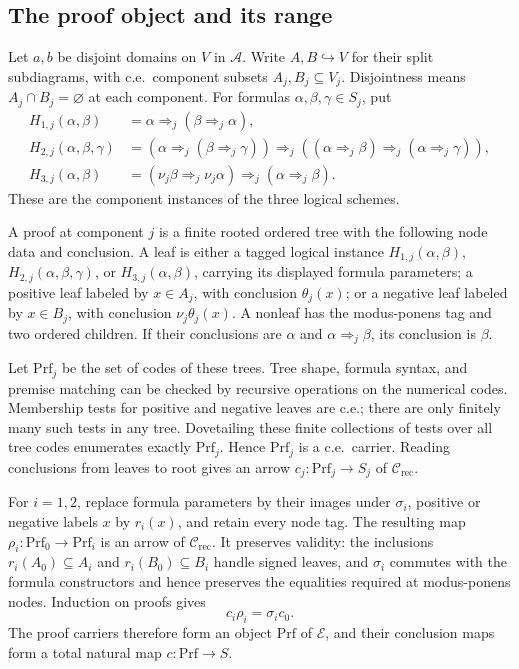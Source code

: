 \documentclass[11pt]{article}
\begin{document}
\subsection{The proof object and its range}

Let $a,b$ be disjoint domains on $V$ in $\mathcal A$.
Write $A,B\hookrightarrow V$ for their split subdiagrams, with
c.e.\ component subsets $A_j,B_j\subseteq V_j$. Disjointness
means $A_j\cap B_j=\varnothing$ at each component.
For formulas $\alpha,\beta,\gamma\in S_j$, put
\begin{align*}
 H_{1,j}(\alpha,\beta)
   &=\alpha\Rightarrow_j(\beta\Rightarrow_j\alpha),\\
 H_{2,j}(\alpha,\beta,\gamma)
   &=(\alpha\Rightarrow_j(\beta\Rightarrow_j\gamma))
     \Rightarrow_j((\alpha\Rightarrow_j\beta)
                          \Rightarrow_j(\alpha\Rightarrow_j\gamma)),\\
 H_{3,j}(\alpha,\beta)
   &=(\nu_j\beta\Rightarrow_j\nu_j\alpha)
                          \Rightarrow_j(\alpha\Rightarrow_j\beta).
\end{align*}
These are the component instances of the three logical schemes.

A proof at component $j$ is a finite rooted ordered tree with
the following node data and conclusion. A leaf is either a
tagged logical instance $H_{1,j}(\alpha,\beta)$,
$H_{2,j}(\alpha,\beta,\gamma)$, or
$H_{3,j}(\alpha,\beta)$, carrying its displayed formula
parameters; a positive leaf labeled by $x\in A_j$, with
conclusion $\theta_j(x)$; or a negative leaf labeled by
$x\in B_j$, with conclusion $\nu_j\theta_j(x)$.
A nonleaf has the modus-ponens tag and two ordered children.
If their conclusions are $\alpha$ and
$\alpha\Rightarrow_j\beta$, its conclusion is $\beta$.

Let $\mathrm{Prf}_j$ be the set of codes of these trees.
Tree shape, formula syntax, and premise matching can be checked
by recursive operations on the numerical codes. Membership tests
for positive and negative leaves are c.e.; there are only finitely
many such tests in any tree. Dovetailing these finite collections
of tests over all tree codes enumerates exactly $\mathrm{Prf}_j$.
Hence $\mathrm{Prf}_j$ is a c.e.\ carrier.
Reading conclusions from leaves to root gives an arrow
$c_j:\mathrm{Prf}_j\to S_j$ of $\mathcal C_{\mathrm{rec}}$.

For $i=1,2$, replace formula parameters by their images under
$\sigma_i$, positive or negative labels $x$ by $r_i(x)$, and
retain every node tag. The resulting map
$\rho_i:\mathrm{Prf}_0\to\mathrm{Prf}_i$ is an arrow of
$\mathcal C_{\mathrm{rec}}$.
It preserves validity: the inclusions $r_i(A_0)\subseteq A_i$
and $r_i(B_0)\subseteq B_i$ handle signed leaves, and
$\sigma_i$ commutes with the formula constructors and hence
preserves the equalities required at modus-ponens nodes.
Induction on proofs gives
\[
 c_i\rho_i=\sigma_i c_0.
\]
The proof carriers therefore form an object $\mathrm{Prf}$ of
$\mathcal E$, and their conclusion maps form a total natural map
$c:\mathrm{Prf}\to S$.
\end{document}
